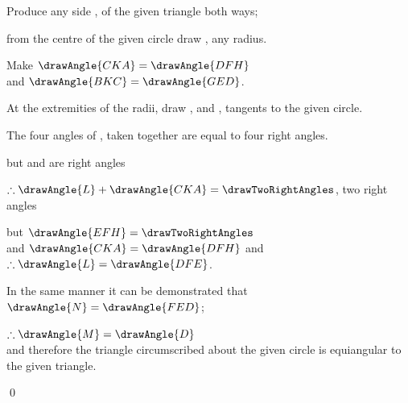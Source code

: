 \documentclass[booklanguage=english]{byrnebook}
\begin{document}
\begin{center}
Produce any side , of the given triangle both ways;

from the centre of the given circle draw , any radius.

Make $\drawAngle{CKA} = \drawAngle{DFH}$ \\
and $\drawAngle{BKC} = \drawAngle{GED}$.

At the extremities of the radii, draw ,  and , tangents to the given circle. 

The four angles of
,
taken together are equal to four right angles. 

but  and  are right angles \byref{\constref}

$\therefore \drawAngle{L} + \drawAngle{CKA} = \drawTwoRightAngles$, two right angles

but $\drawAngle{EFH} = \drawTwoRightAngles$ \\
and $\drawAngle{CKA} = \drawAngle{DFH}$ \byref{\constref} and $\therefore \drawAngle{L} = \drawAngle{DFE}$.

In the same manner it can be demonstrated that\\
$\drawAngle{N} = \drawAngle{FED}$;

$\therefore \drawAngle{M} = \drawAngle{D}$ \\
and therefore the triangle circumscribed about the given circle is equiangular to the given triangle.
\end{center}

\qed
\end{document}

